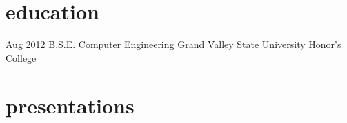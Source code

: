 \documentclass[a4paper]{cv-friggeri-x}
\begin{document}
\section{education}

\begin{entrylist}


\entry
{Aug 2012}
{B.S.E. Computer Engineering}
{Grand Valley State University}
{Honor's College}


\end{entrylist}


\section{presentations}
\end{document}
